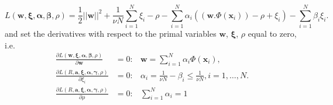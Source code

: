 \documentclass[conference]{IEEEtran}
\theoremstyle{problemstyle}
\begin{document}
\begin{equation}
\label{equ:lagrangian}
L(\mathbf{w}, \boldsymbol{\xi}, \boldsymbol{\alpha}, \boldsymbol{\beta},\rho)=\frac{1}{2}\left|\left| \mathbf{w}\right|\right|^2 + \frac{1}{\nu N}\sum_{i=1}^N\xi_i -\rho-\sum_{i=1}^N\alpha_i((\mathbf{w}.\Phi(\mathbf{x}_i))-\rho +\xi_i)-\sum_{i=1}^N\beta_i\xi_i.
\end{equation}
and set the derivatives with respect to the primal variables $\mathbf{w}$, $\boldsymbol{\xi}$, $\rho$ equal to zero, i.e.
\begin{eqnarray}
\label{equ:supportvm}
\frac{\partial L(\mathbf{w}, \boldsymbol{\xi}, \boldsymbol{\alpha}, \boldsymbol{\beta},\rho)}{\partial \mathbf{w}} & = 0: & \mathbf{w}=\sum_{i=1}^N\alpha_i\Phi(\mathbf{x}_i),\\%
\label{equ:alphai1}
\frac{\partial L(R, \mathbf{a},\boldsymbol{\xi}, \boldsymbol{\alpha}, \boldsymbol{\gamma},\rho)}{\partial \xi_i}  & =0: & \alpha_i=\frac{1}{\nu N}-\beta_i \leq \frac{1}{\nu N},  i=1,\ldots,N. \\
\label{equ:alphai2}
\frac{\partial L(R, \mathbf{a},\boldsymbol{\xi}, \boldsymbol{\alpha}, \boldsymbol{\gamma},\rho)}{\partial \rho} & = 0: & \sum_{i=1}^N\alpha_i=1\\
\end{eqnarray}
\end{document}
